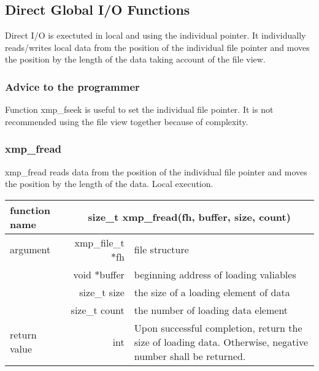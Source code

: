    \subsection{Direct Global I/O Functions}

   Direct I/O is exectuted in local and using the individual pointer. 
   It individually reads/writes local data
   from the position of the individual file pointer and 
   moves the position by the length of the data taking account of the file view.

   \subsubsection*{Advice to the programmer}

   Function xmp\_fseek is useful to set the individual file pointer.
   It is not recommended using the file view together because of complexity.

   \subsubsection{xmp\_fread}
   xmp\_fread reads data from the position of the individual file
   pointer and moves the position by the length of the data.
   Local execution.

   \begin{table}[h]
    \begin{center}
     \begin{tabular}{|l|r|p{80mm}|}
      \hline
      {\bf function name}  & \multicolumn{2}{c|}{\bf size\_t
      xmp\_fread(fh, buffer, size, count)} \\ \hline \hline
      argument & xmp\_file\_t $*$fh & file structure \\ \cline{2-3}
      & void $*$buffer & beginning address of loading valiables \\ \cline{2-3}
      & size\_t size & the size of a loading element of data \\ \cline{2-3}
      & size\_t count & the number of loading data element \\ \hline
      return value & int & Upon successful completion, return the size
	      of loading data. Otherwise, negative number shall be
	      returned. \\ \hline
      \end{tabular}
     \end{center}
    \label{tb:aaa}
   \end{table}

